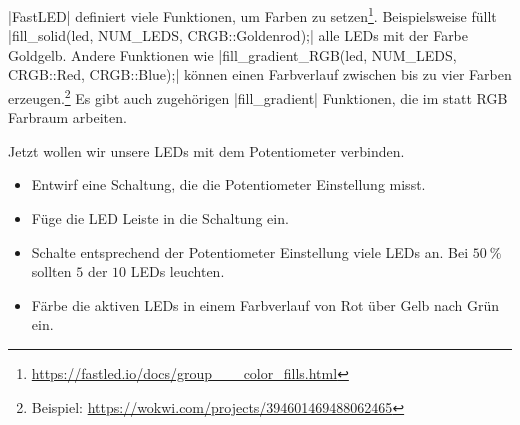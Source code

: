 \documentclass[a4paper,12pt]{book}
\begin{document}
\begin{center}
\end{center}

|FastLED| definiert viele Funktionen, um Farben zu setzen\footnote{\url{https://fastled.io/docs/group___color_fills.html}}.
Beispielsweise füllt |fill_solid(led, NUM_LEDS, CRGB::Goldenrod);| alle LEDs mit der Farbe Goldgelb.
Andere Funktionen wie |fill_gradient_RGB(led, NUM_LEDS, CRGB::Red, CRGB::Blue);| können einen Farbverlauf zwischen bis zu vier Farben erzeugen.\footnote{Beispiel: \url{https://wokwi.com/projects/394601469488062465}}
Es gibt auch zugehörigen |fill_gradient| Funktionen, die im  statt RGB Farbraum arbeiten.

Jetzt wollen wir unsere LEDs mit dem Potentiometer verbinden.
\begin{instruction}
  \begin{itemize}
    \item Entwirf eine Schaltung, die die Potentiometer Einstellung misst.
    \item Füge die LED Leiste in die Schaltung ein.
    \item Schalte entsprechend der Potentiometer Einstellung viele LEDs an. Bei $\SI{50}{\percent}$ sollten $5$ der $10$ LEDs leuchten.
    \item Färbe die aktiven LEDs in einem Farbverlauf von Rot über Gelb nach Grün ein.
  \end{itemize}
\end{instruction}
\end{document}
